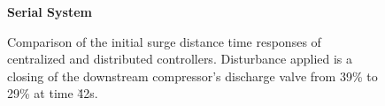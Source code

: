 \begin{figure}
  {\centering\large\textbf{Serial System}\\[1em]}
  \begin{subfigure}{0.48\linewidth}
    \footnotesize
    
    \normalsize
  \end{subfigure}
  \hfill
  \begin{subfigure}{0.48\linewidth}
    \footnotesize
    
    \normalsize
  \end{subfigure}
  \caption[Zoom of surge distance time response.]{Comparison of the initial surge distance time responses of centralized and distributed controllers. Disturbance applied is a closing of the downstream compressor's discharge valve from 39\% to 29\% at time \u{42}{s}.}
  \label{fig:res:serial-sd-zoom}
\end{figure}
\fi


